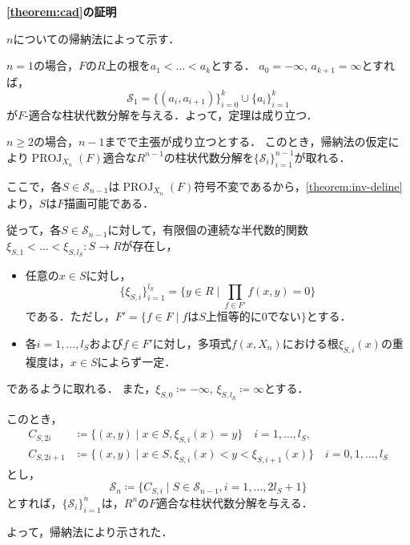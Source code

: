 \documentclass[uplatex, dvipdfmx]{jsarticle}
\makeatletter
\numberwithin{equation}{section}
\renewenvironment{proof}[1][\proofname]{\par
  \pushQED{\qed}%
  \normalfont \topsep6\p@\@plus6\p@\relax
  \trivlist
  \item\relax
  {\bfseries
  #1\@addpunct{.}}\hspace\labelsep\ignorespaces
}{
  \popQED\endtrivlist\@endpefalse
}
\newcommand{\map}[3]{{#1}\colon{#2}\rightarrow{#3}}
\DeclareMathOperator{\PROJ}{PROJ}
\theoremstyle{definition}
\renewcommand{\proofname}{\textbf{証明}}
\makeatother
\begin{document}
\begin{proof}[\cref{theorem:cad}の証明]
     $n$についての帰納法によって示す．

     $n=1$の場合，$F$の$R$上の根を$a_1 < \dots < a_k$とする．
     $a_0 = -\infty$, $a_{k+1} = \infty$とすれば，
     \begin{equation}
          \mathcal{S}_1 = \{(a_i, a_{i+1})\}_{i=0}^k \cup \{a_i\}_{i=1}^k
     \end{equation}
     が$F$-適合な柱状代数分解を与える．よって，定理は成り立つ．

     $n\geq 2$の場合，$n-1$までで主張が成り立つとする．
     このとき，帰納法の仮定により$\PROJ_{X_n}(F)$適合な$R^{n-1}$の柱状代数分解を$\{\mathcal{S}_i\}_{i=1}^{n-1}$が取れる．

     ここで，各$S \in \mathcal{S}_{n-1}$は$\PROJ_{X_n}(F)$符号不変であるから，\cref{theorem:inv-deline}より，$S$は$F$描画可能である．

     従って，各$S \in \mathcal{S}_{n-1}$に対して，有限個の連続な半代数的関数$\map{\xi_{S,1}< \dots < \xi_{S,l_S}}{S}{R}$が存在し，
     \begin{itemize}
          \item 任意の$ x \in S $に対し，
          \begin{equation}
               \{\xi_{S,i}\}_{i=1}^{l_S} = \{y \in R \mid \prod_{f \in F'}f(x,y)=0\}
          \end{equation}
          である．ただし，$F' = \{f \in F \mid \text{$f$は$S$上恒等的に0でない}\}$とする．
          \item 各$i=1, \dots, l_S$および$f \in F'$に対し，多項式$f(x,X_n)$における根$\xi_{S,i}(x)$の重複度は，$x\in S$によらず一定．
     \end{itemize}
     であるように取れる．
     また，$\xi_{S,0} \coloneqq -\infty$, $\xi_{S,l_S} \coloneqq \infty$とする．

     このとき，
     \begin{align}
          C_{S,2i} &\coloneqq \{(x,y) \mid  x \in S, \xi_{S,i}(x) = y \} \quad i = 1,\dots, l_S,\\
          C_{S,2i+1} &\coloneqq \{(x,y) \mid x \in S, \xi_{S,i}(x)<y<\xi_{S,i+1}(x) \} \quad i = 0,1, \dots, l_S 
     \end{align}
     とし，
     \begin{equation}
          \mathcal{S}_n \coloneqq \{C_{S,i} \mid S \in \mathcal{S}_{n-1}, i=1, \dots, 2l_S+1\}
     \end{equation}
     とすれば，$\{\mathcal{S}_i\}_{i=1}^n$は，$R^n$の$F$適合な柱状代数分解を与える．

     よって，帰納法により示された．
\end{proof}
\end{document}
